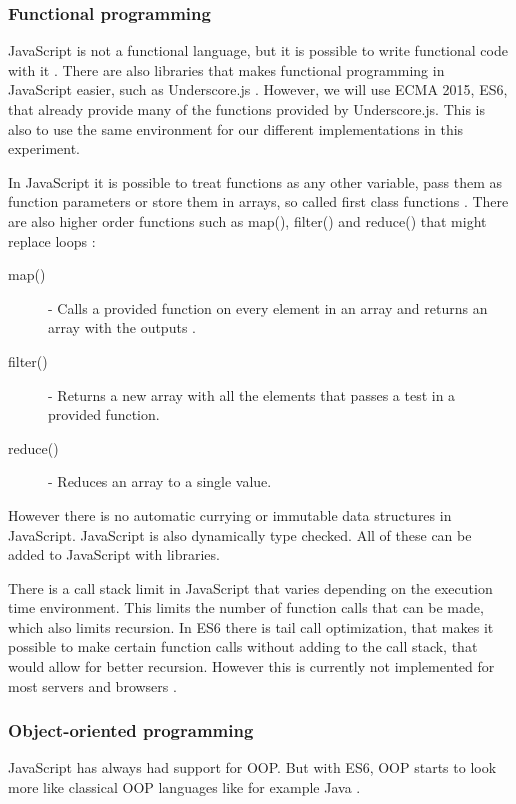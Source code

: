 \documentclass {article}
\begin{document}
\subsubsection{Functional programming}
\label{sec:js-fp}
JavaScript is not a functional language, but it is possible to write functional code with it \cite{drboolean}. There are also libraries that makes functional programming in JavaScript easier, such as Underscore.js \cite{underscorejs} \cite{fogus}. However, we will use ECMA 2015, ES6, that already provide many of the functions provided by Underscore.js. This is also to use the same environment for our different implementations in this experiment.

In JavaScript it is possible to treat functions as any other variable, pass them as function parameters or store them in arrays, so called first class functions \cite{drboolean}. There are also higher order functions such as map(), filter() and reduce() that might replace loops \cite{grady}:

\begin{description}
\item [map()] - Calls a provided function on every element in an array and returns an array with the outputs \cite{jsref}.
\item [filter()] - Returns a new array with all the elements that passes a test in a provided function. 
\item [reduce()] - Reduces an array to a single value.
\end{description}

However there is no automatic currying or immutable data structures in JavaScript. JavaScript is also dynamically type checked. All of these can be added to JavaScript with libraries.

There is a call stack limit in JavaScript that varies depending on the execution time environment. This limits the number of function calls that can be made, which also limits recursion. In ES6 there is tail call optimization, that makes it possible to make certain function calls without adding to the call stack, that would allow for better recursion. However this is currently not implemented for most servers and browsers \cite{ecma6table}.
\subsubsection{Object-oriented programming}
JavaScript has always had support for OOP. But 
with ES6, OOP starts to look more like classical OOP languages like for example Java \cite{ecmacompare}.
\end{document}
